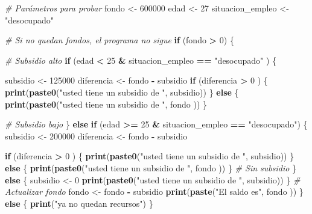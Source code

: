 \documentclass[
]{article}
\newenvironment{Shaded}{\begin{snugshade}}{\end{snugshade}}
\newcommand{\CommentTok}[1]{\textcolor[rgb]{0.56,0.35,0.01}{\textit{#1}}}
\newcommand{\ControlFlowTok}[1]{\textcolor[rgb]{0.13,0.29,0.53}{\textbf{#1}}}
\newcommand{\DecValTok}[1]{\textcolor[rgb]{0.00,0.00,0.81}{#1}}
\newcommand{\FunctionTok}[1]{\textcolor[rgb]{0.13,0.29,0.53}{\textbf{#1}}}
\newcommand{\NormalTok}[1]{#1}
\newcommand{\OtherTok}[1]{\textcolor[rgb]{0.56,0.35,0.01}{#1}}
\newcommand{\SpecialCharTok}[1]{\textcolor[rgb]{0.81,0.36,0.00}{\textbf{#1}}}
\newcommand{\StringTok}[1]{\textcolor[rgb]{0.31,0.60,0.02}{#1}}
\begin{document}
\begin{Shaded}
\begin{Highlighting}[]
\CommentTok{\# Parámetros para probar}
\NormalTok{fondo }\OtherTok{\textless{}{-}} \DecValTok{600000}
\NormalTok{edad }\OtherTok{\textless{}{-}} \DecValTok{27}
\NormalTok{situacion\_empleo }\OtherTok{\textless{}{-}} \StringTok{"desocupado"} 


\CommentTok{\# Si no quedan fondos, el programa no sigue}
\ControlFlowTok{if}\NormalTok{ (fondo }\SpecialCharTok{\textgreater{}} \DecValTok{0}\NormalTok{) \{}
  
  \CommentTok{\# Subsidio alto}
  \ControlFlowTok{if}\NormalTok{ (edad  }\SpecialCharTok{\textless{}} \DecValTok{25} \SpecialCharTok{\&}\NormalTok{ situacion\_empleo }\SpecialCharTok{==} \StringTok{"desocupado"}\NormalTok{ ) \{}
    
\NormalTok{    subsidio }\OtherTok{\textless{}{-}} \DecValTok{125000}
\NormalTok{    diferencia }\OtherTok{\textless{}{-}}\NormalTok{ fondo }\SpecialCharTok{{-}}\NormalTok{  subsidio}
    \ControlFlowTok{if}\NormalTok{ (diferencia }\SpecialCharTok{\textgreater{}} \DecValTok{0}\NormalTok{ ) \{}
      \FunctionTok{print}\NormalTok{(}\FunctionTok{paste0}\NormalTok{(}\StringTok{"usted tiene un subsidio de "}\NormalTok{, subsidio))}
\NormalTok{    \} }\ControlFlowTok{else}\NormalTok{ \{}
      \FunctionTok{print}\NormalTok{(}\FunctionTok{paste0}\NormalTok{(}\StringTok{"usted tiene un subsidio de "}\NormalTok{, fondo ))}
\NormalTok{    \}}
    
  \CommentTok{\# Subsidio bajo}
\NormalTok{  \} }\ControlFlowTok{else} \ControlFlowTok{if}\NormalTok{ (edad  }\SpecialCharTok{\textgreater{}=} \DecValTok{25} \SpecialCharTok{\&}\NormalTok{ situacion\_empleo }\SpecialCharTok{==} \StringTok{"desocupado"}\NormalTok{) \{}
\NormalTok{    subsidio }\OtherTok{\textless{}{-}} \DecValTok{200000}
\NormalTok{    diferencia }\OtherTok{\textless{}{-}}\NormalTok{ fondo }\SpecialCharTok{{-}}\NormalTok{  subsidio}

    \ControlFlowTok{if}\NormalTok{ (diferencia }\SpecialCharTok{\textgreater{}} \DecValTok{0}\NormalTok{ ) \{}
      \FunctionTok{print}\NormalTok{(}\FunctionTok{paste0}\NormalTok{(}\StringTok{"usted tiene un subsidio de "}\NormalTok{, subsidio))}
\NormalTok{    \} }\ControlFlowTok{else}\NormalTok{ \{}
      \FunctionTok{print}\NormalTok{(}\FunctionTok{paste0}\NormalTok{(}\StringTok{"usted tiene un subsidio de "}\NormalTok{, fondo ))}
\NormalTok{    \}}
  \CommentTok{\# Sin subsidio}
\NormalTok{  \} }\ControlFlowTok{else}\NormalTok{ \{}
\NormalTok{    subsidio }\OtherTok{\textless{}{-}} \DecValTok{0}
    \FunctionTok{print}\NormalTok{(}\FunctionTok{paste0}\NormalTok{(}\StringTok{"usted tiene un subsidio de "}\NormalTok{, subsidio))}
\NormalTok{  \}}
  \CommentTok{\# Actualizar fondo}
\NormalTok{  fondo }\OtherTok{\textless{}{-}}\NormalTok{ fondo }\SpecialCharTok{{-}}\NormalTok{ subsidio}
  \FunctionTok{print}\NormalTok{(}\FunctionTok{paste}\NormalTok{(}\StringTok{"El saldo es"}\NormalTok{, fondo ))}
\NormalTok{\} }\ControlFlowTok{else}\NormalTok{ \{}
  \FunctionTok{print}\NormalTok{(}\StringTok{"ya no quedan recursos"}\NormalTok{)}
\NormalTok{\}}
\end{Highlighting}
\end{Shaded}
\end{document}

